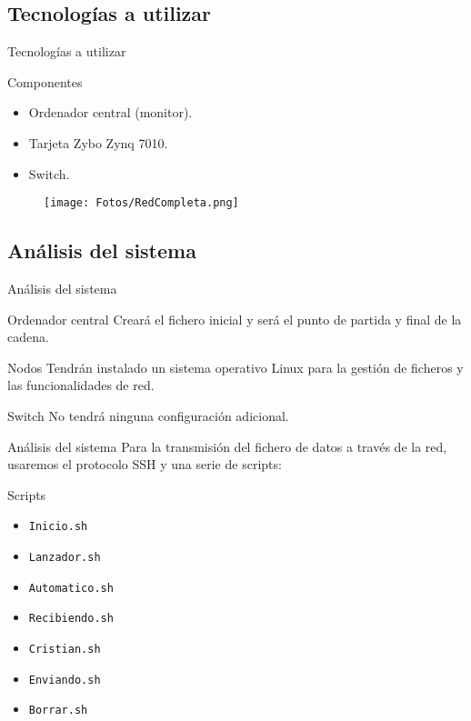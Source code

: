 \documentclass[aspectratio=169]{beamer}
\begin{document}
\subsection{Tecnologías a utilizar}
\begin{frame}{Tecnologías a utilizar}
\begin{block}{Componentes}
	\begin{itemize}
		\item Ordenador central (monitor).
		\item Tarjeta Zybo Zynq 7010.
		\item Switch.
	\end{itemize}
\end{block}
\begin{figure}[h]
\centering
\texttt{[image: Fotos/RedCompleta.png]}
\end{figure}
\end{frame}

\subsection{Análisis del sistema}
\begin{frame}{Análisis del sistema}
\begin{block}{Ordenador central}
	Creará el fichero inicial y será el punto de partida y final de la cadena.
\end{block}
\begin{block}{Nodos}
	Tendrán instalado un sistema operativo Linux para la gestión de ficheros y las funcionalidades de red.
\end{block}
\begin{block}{Switch}
	No tendrá ninguna configuración adicional.
\end{block}
\end{frame}

\begin{frame}{Análisis del sistema}
	Para la transmisión del fichero de datos a través de la red, usaremos el protocolo SSH y una serie de scripts:
	\begin{block}{Scripts}
		\begin{itemize}
			\item \texttt{Inicio.sh}
			\item \texttt{Lanzador.sh}
			\item \texttt{Automatico.sh}
			\item \texttt{Recibiendo.sh}
			\item \texttt{Cristian.sh}
			\item \texttt{Enviando.sh}
			\item \texttt{Borrar.sh}
		\end{itemize}
	\end{block}
\end{frame}
\end{document}

